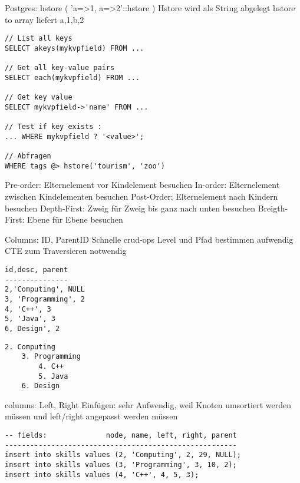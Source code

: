 \documentclass[ngerman,a4paper,12pt]{scrreprt}
\begin{document}

\ul
	\li Postgres: hstore ( 'a=>1, a=>2'::hstore )
	\li Hstore wird als String abgelegt
	\li hstore to array liefert {a,1,b,2}
\ulE

\begin{verbatim}
// List all keys
SELECT akeys(mykvpfield) FROM ...

// Get all key-value pairs
SELECT each(mykvpfield) FROM ...

// Get key value
SELECT mykvpfield->'name' FROM ...

// Test if key exists :
... WHERE mykvpfield ? '<value>';

// Abfragen
WHERE tags @> hstore('tourism', 'zoo')
\end{verbatim}


\ul
	\li Pre-order: Elternelement vor Kindelement besuchen
	\li In-order: Elternelement zwischen Kindelementen besuchen
	\li Post-Order: Elternelement nach Kindern besuchen
	\li Depth-First: Zweig für Zweig bis ganz nach unten besuchen
	\li Breigth-First: Ebene für Ebene besuchen
\ulE

\ul
	\li Columns: ID, ParentID
	\li Schnelle crud-ops
	\li Level und Pfad bestimmen aufwendig
	\li CTE zum Traversieren notwendig
\ulE
{}
\begin{verbatim}
id,desc, parent
---------------
2,'Computing', NULL
3, 'Programming', 2
4, 'C++', 3
5, 'Java', 3
6, Design', 2
\end{verbatim}

\begin{verbatim}
2. Computing
    3. Programming
        4. C++
        5. Java
    6. Design
\end{verbatim}

\ul
	\li columns: Left, Right
	\li Einfügen: sehr Aufwendig, weil Knoten umsortiert werden müssen und left/right angepasst werden müssen
\ulE
{}
\begin{verbatim}
-- fields:              node, name, left, right, parent
-------------------------------------------------------
insert into skills values (2, 'Computing', 2, 29, NULL);
insert into skills values (3, 'Programming', 3, 10, 2);
insert into skills values (4, 'C++', 4, 5, 3);
\end{verbatim}
\end{document}
